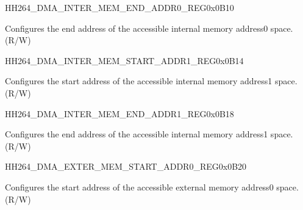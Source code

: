 \begin{register}{H}{H264\_DMA\_INTER\_MEM\_END\_ADDR0\_REG}{0x0B10}\label{regdesc:H264DMAINTERMEMENDADDR0REG}
%
\regnewline%
\begin{regdesc}\begin{reglist}
\label{fielddesc:H264DMAACCESSINTERMEMENDADDR0}\item [H264\_DMA\_ACCESS\_INTER\_MEM\_END\_ADDR0] Configures the end address of the accessible internal memory address0 space. (R/W)
\end{reglist}\end{regdesc}
\end{register}


\begin{register}{H}{H264\_DMA\_INTER\_MEM\_START\_ADDR1\_REG}{0x0B14}\label{regdesc:H264DMAINTERMEMSTARTADDR1REG}
%
\regnewline%
\begin{regdesc}\begin{reglist}
\label{fielddesc:H264DMAACCESSINTERMEMSTARTADDR1}\item [H264\_DMA\_ACCESS\_INTER\_MEM\_START\_ADDR1] Configures the start address of the accessible internal memory address1 space. (R/W)
\end{reglist}\end{regdesc}
\end{register}


\begin{register}{H}{H264\_DMA\_INTER\_MEM\_END\_ADDR1\_REG}{0x0B18}\label{regdesc:H264DMAINTERMEMENDADDR1REG}
%
\regnewline%
\begin{regdesc}\begin{reglist}
\label{fielddesc:H264DMAACCESSINTERMEMENDADDR1}\item [H264\_DMA\_ACCESS\_INTER\_MEM\_END\_ADDR1] Configures the end address of the accessible internal memory address1 space. (R/W)
\end{reglist}\end{regdesc}
\end{register}


\begin{register}{H}{H264\_DMA\_EXTER\_MEM\_START\_ADDR0\_REG}{0x0B20}\label{regdesc:H264DMAEXTERMEMSTARTADDR0REG}
%
\regnewline%
\begin{regdesc}\begin{reglist}
\label{fielddesc:H264DMAACCESSEXTERMEMSTARTADDR0}\item [H264\_DMA\_ACCESS\_EXTER\_MEM\_START\_ADDR0] Configures the start address of the accessible external memory address0 space. (R/W)
\end{reglist}\end{regdesc}
\end{register}


